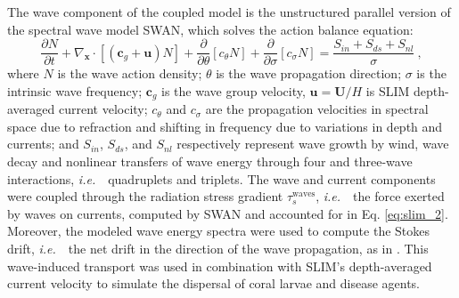\documentclass[fleqn,10pt]{wlscirep}
\newcommand{\ie}{{\it i.e.}\ }
\begin{document}
The wave component of the coupled model is the unstructured parallel version of the spectral wave model SWAN, which solves the action balance equation:
\begin{equation}
    \dfrac{\partial N}{\partial t} + \nabla_\mathbf{x}\cdot[(\mathbf{c}_g+\mathbf{u})N] + \dfrac{\partial }{\partial \theta}[c_\theta N] + \dfrac{\partial}{\partial \sigma}[c_\sigma N] = \dfrac{S_{in}+S_{ds}+S_{nl}}{\sigma}~, \label{eq:swan}
\end{equation}
where $N$ is the wave action density; $\theta$ is the wave propagation direction; $\sigma$ is the intrinsic wave frequency; $\mathbf{c}_g$ is the wave group velocity, $\mathbf{u}=\mathbf{U}/H$ is SLIM depth-averaged current velocity; $c_\theta$ and $c_\sigma$ are the propagation velocities in spectral space due to refraction and shifting in frequency due to variations in depth and currents; and $S_{in}$, $S_{ds}$, and $S_{nl}$ respectively represent wave growth by wind, wave decay and nonlinear transfers of wave energy through four and three-wave interactions, \ie~quadruplets and triplets. The wave and current components were coupled through the radiation stress gradient {\boldmath$\tau$}$_s^\text{waves}$, \ie~the force exerted by waves on currents, computed by SWAN and accounted for in Eq. \ref{eq:slim_2}. Moreover, the modeled wave energy spectra were used to compute the Stokes drift, \ie~the net drift in the direction of the wave propagation, as in \cite{DobbyIrma}. This wave-induced transport was used in combination with SLIM's depth-averaged current velocity to simulate the dispersal of coral larvae and disease agents.
\end{document}
